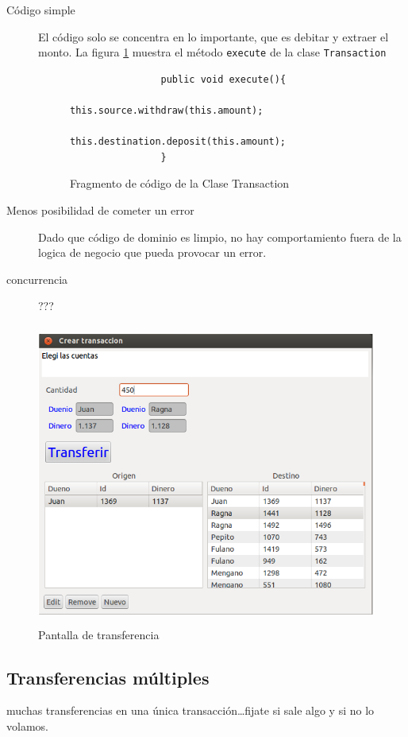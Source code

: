 	\begin{description}
		\item[Código simple] El código solo se concentra en lo importante, que es
		debitar y extraer el monto.
		La figura \ref{executeTransaction} muestra el método  \lstinline|execute| de la
		clase \lstinline|Transaction| 
		\begin{figure}[h]
			\begin{lstlisting}
				public void execute(){
					this.source.withdraw(this.amount);
					this.destination.deposit(this.amount);
				}
			\end{lstlisting}
			\caption{Fragmento de código de la Clase Transaction}
			\label{executeTransaction}
		\end{figure}
		 
		\item[Menos posibilidad de cometer un error] Dado que código de dominio es
		limpio, no hay comportamiento fuera de la logica de negocio que pueda provocar
		un error.
		\item[concurrencia]???
	\end{description}
	
	
	\begin{figure}[h]
		\centering
		\includegraphics[width=450px, height=375px]{img/simple-transferencia}
		\caption{Pantalla de transferencia}
		\label{trasferenciaSimple}
	\end{figure}
  	
\subsection{Transferencias múltiples}
	muchas transferencias en una única transacción\ldots fijate si sale algo y si no
	lo volamos.

